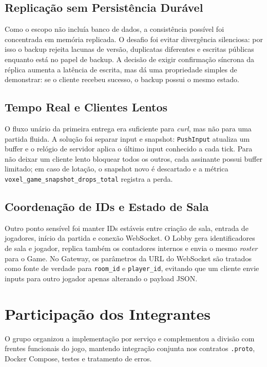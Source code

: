 \documentclass[portuguese]{sbcreviews-2025}%
\begin{document}
\subsection{Replicação sem Persistência Durável}

Como o escopo não incluía banco de dados, a consistência possível foi concentrada em memória replicada. O desafio foi evitar divergência silenciosa: por isso o backup rejeita lacunas de versão, duplicatas diferentes e escritas públicas enquanto está no papel de backup. A decisão de exigir confirmação síncrona da réplica aumenta a latência de escrita, mas dá uma propriedade simples de demonstrar: se o cliente recebeu sucesso, o backup possui o mesmo estado.

\subsection{Tempo Real e Clientes Lentos}

O fluxo unário da primeira entrega era suficiente para \textit{curl}, mas não para uma partida fluida. A solução foi separar input e snapshot: \texttt{PushInput} atualiza um buffer e o relógio de servidor aplica o último input conhecido a cada tick. Para não deixar um cliente lento bloquear todos os outros, cada assinante possui buffer limitado; em caso de lotação, o snapshot novo é descartado e a métrica \texttt{voxel\_game\_snapshot\_drops\_total} registra a perda.

\subsection{Coordenação de IDs e Estado de Sala}

Outro ponto sensível foi manter IDs estáveis entre criação de sala, entrada de jogadores, início da partida e conexão WebSocket. O Lobby gera identificadores de sala e jogador, replica também os contadores internos e envia o mesmo \textit{roster} para o Game. No Gateway, os parâmetros da URL do WebSocket são tratados como fonte de verdade para \texttt{room\_id} e \texttt{player\_id}, evitando que um cliente envie inputs para outro jogador apenas alterando o payload JSON.

\section{Participação dos Integrantes}

O grupo organizou a implementação por serviço e complementou a divisão com frentes funcionais do jogo, mantendo integração conjunta nos contratos \texttt{.proto}, Docker Compose, testes e tratamento de erros.
\end{document}
